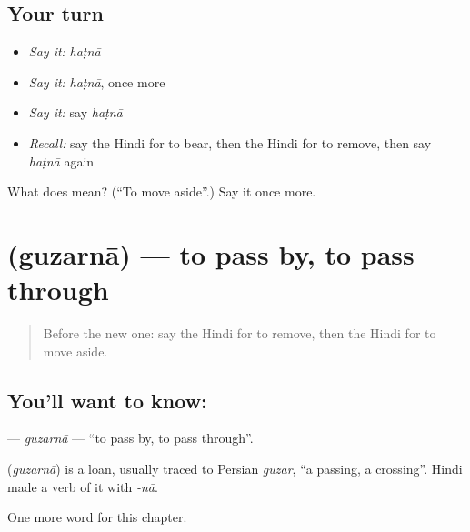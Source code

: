 \subsection*{Your turn}
\begin{itemize}
\raggedright
  \item \emph{Say it:} \emph{haṭnā}
  \item \emph{Say it:} \emph{haṭnā}, once more
  \item \emph{Say it:} say \emph{haṭnā}
  \item \emph{Recall:} say the Hindi for to bear, then the Hindi for to remove, then say \emph{haṭnā} again
\end{itemize}

\begin{tcolorbox}[breakable,colback=teal!4,colframe=teal!35!black,title={Before you move on}]
What does  mean? (\textquotedblleft{}To move aside\textquotedblright{}.) Say it once more.
\end{tcolorbox}
\section[\texorpdfstring{\hi{गुज़रना} (guzarnā)}{गुज़रना (guzarnā)}]{ (guzarnā) — to pass by, to pass through}

\label{lesson:HI-C179-guzarna}



\begin{quote}
Before the new one: say the Hindi for to remove, then the Hindi for to move aside.
\end{quote}

\subsection*{You'll want to know: }
\textbf{} — \emph{guzarnā} — \textquotedblleft{}to pass by, to pass through\textquotedblright{}.

\begin{cousinweb}
\textbf{} (\emph{guzarnā}) is a loan, usually traced to Persian \emph{guzar}, \textquotedblleft{}a passing, a crossing\textquotedblright{}. Hindi made a verb of it with \emph{-nā}.
\end{cousinweb}

\begin{grammarlens}[title={What you've built}]
One more word for this chapter.
\end{grammarlens}

